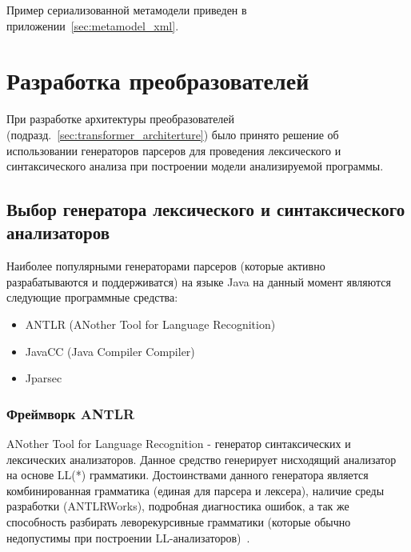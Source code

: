 Пример сериализованной метамодели приведен в приложении~\ref{sec:metamodel_xml}.

\section{Разработка преобразователей}

При разработке архитектуры преобразователей
(подразд.~\ref{sec:transformer_architerture}) было принято решение об
использовании генераторов парсеров для проведения лексического и синтаксического
анализа при построении модели анализируемой программы.

\subsection{Выбор генератора лексического и синтаксического анализаторов}

Наиболее популярными генераторами парсеров (которые активно разрабатываются и
поддерживатся) на языке Java на данный момент являются следующие программные
средства:


\begin{itemize}
    \item ANTLR (ANother Tool for Language Recognition)
    \item JavaCC (Java Compiler Compiler)
    \item Jparsec
\end{itemize}

\subsubsection{Фреймворк ANTLR}

ANother Tool for Language Recognition - генератор синтаксических и лексических
анализаторов. Данное средство генерирует нисходящий анализатор на основе LL(*)
грамматики. Достоинствами данного генератора является комбинированная грамматика
(единая для парсера и лексера), наличие среды разработки (ANTLRWorks), подробная
диагностика ошибок, а так же способность разбирать леворекурсивные грамматики
(которые обычно недопустимы при построении LL-анализаторов)~\cite{parr_definitive_2007}.

